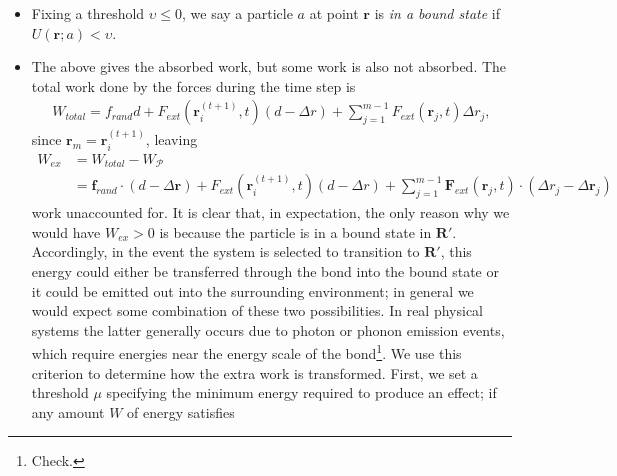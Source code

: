 \documentclass[12pt,letterpaper]{article}
\newcommand{\mb}{\mathbf}
\newcommand{\mc}{\mathcal}
\begin{document}
\begin{itemize}
\begin{align*}
\begin{cases}
V(x, y) - V(x, y-1),  &\textnormal{else.}
\end{cases}
\end{align*}
These operators combine to give a notion of gradient for a discrete vector field such as $V$,
\begin{align*}
\nabla V(\mb{r}) &= \left({\Delta_{x}V(\mb{r}) + \nabla_{x}V(\mb{r}) \over 2}, {\Delta_{y}V(\mb{r}) + \nabla_{y}V(\mb{r}) \over 2}\right),
\end{align*}
which we extend linearly to the potential energy $U$. In analogy with the continuous case we define $\mb{F}_{int} = -\nabla U$ to be the force field corresponding to the potential $V$. This is used to compute the net force experienced by particles and thereby determine the velocity bound during a transition.
\item Fixing a threshold $\upsilon \leqslant 0$, we say a particle $a$ at point $\mb{r}$ is {\em in a bound state} if $U(\mb{r}; a) < \upsilon$.
\item The above gives the absorbed work, but some work is also not absorbed. The total work done by the forces during the time step is
\begin{align*}
W_{total} = f_{rand}d + F_{ext}(\mb{r}_{i}^{(t+1)}, t)(d - \Delta r) + \sum_{j=1}^{m-1}F_{ext}(\mb{r}_{j}, t) \Delta r_{j},
\end{align*}
since $\mb{r}_{m} = \mb{r}_{i}^{(t+1)}$, leaving
\begin{align*}
W_{ex} &= W_{total} - W_{\mc{P}} \\
&= \mb{f}_{rand} \cdot (d - \Delta\mb{r}) + F_{ext}(\mb{r}_{i}^{(t+1)}, t)(d - \Delta r) + \sum_{j=1}^{m-1}\mb{F}_{ext}(\mb{r}_{j}, t) \cdot (\Delta r_{j} - \Delta\mb{r}_{j})
\end{align*}
work unaccounted for. It is clear that, in expectation, the only reason why we would have $W_{ex} > 0$ is because the particle is in a bound state in $\mb{R}'$. Accordingly, in the event the system is selected to transition to $\mb{R}'$, this energy could either be transferred through the bond into the bound state or it could be emitted out into the surrounding environment; in general we would expect some combination of these two possibilities. In real physical systems the latter generally occurs due to photon or phonon emission events, which require energies near the energy scale of the bond\footnote{Check.}. We use this criterion to determine how the extra work is transformed. First, we set a threshold $\mu$ specifying the minimum energy required to produce an effect; if any amount $W$ of energy satisfies

\end{itemize}
\end{document}
